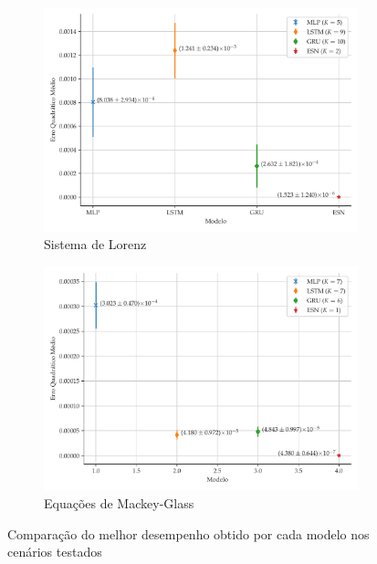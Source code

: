 \documentclass[a4paper, 12pt]{article}
\begin{document}
\begin{figure}[H]
     \centering
     \begin{subfigure}[t]{0.4\textwidth}
         \includegraphics[scale=0.35]{comparacao-k-lorenz.pdf}
         \caption{Sistema de Lorenz}
     \end{subfigure}
     \centering
     \begin{subfigure}[t]{0.4\textwidth} 
         \includegraphics[scale=0.35]{comparacao-k-mackeyglass.pdf}
         \caption{Equações de Mackey-Glass}
     \end{subfigure}  
     \centering   
     \caption{Comparação do melhor desempenho obtido por cada modelo nos cenários testados}
     \label{fig:model-comparison}
\end{figure}
\end{document}
